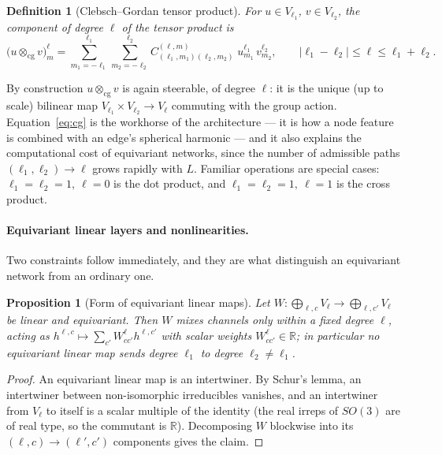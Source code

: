 \documentclass[a4paper,12pt]{article}
\newtheorem{definition}[theorem]{Definition}
\newtheorem{proposition}[theorem]{Proposition}
\theoremstyle{remark}
\begin{document}
\begin{definition}[Clebsch--Gordan tensor product]
\label{def:cg}
For $u\in V_{\ell_1}$, $v\in V_{\ell_2}$, the component of degree $\ell$ of the tensor
product is
\begin{equation}
\label{eq:cg}
\bigl(u\otimes_{\mathrm{cg}}v\bigr)^{\ell}_{m}
=
\sum_{m_1=-\ell_1}^{\ell_1}
\sum_{m_2=-\ell_2}^{\ell_2}
C^{(\ell,m)}_{(\ell_1,m_1)(\ell_2,m_2)}\;
u^{\ell_1}_{m_1}\,v^{\ell_2}_{m_2},
\qquad
|\ell_1-\ell_2|\le\ell\le\ell_1+\ell_2 .
\end{equation}
\end{definition}

By construction $u\otimes_{\mathrm{cg}}v$ is again steerable, of degree $\ell$: it is the
unique (up to scale) bilinear map $V_{\ell_1}\times V_{\ell_2}\to V_\ell$ commuting with
the group action. Equation~\eqref{eq:cg} is the workhorse of the architecture --- it is
how a node feature is combined with an edge's spherical harmonic --- and it also explains
the computational cost of equivariant networks, since the number of admissible paths
$(\ell_1,\ell_2)\to\ell$ grows rapidly with $L$. Familiar operations are special cases:
$\ell_1=\ell_2=1,\ \ell=0$ is the dot product, and $\ell_1=\ell_2=1,\ \ell=1$ is the cross
product.

\paragraph{Equivariant linear layers and nonlinearities.}
Two constraints follow immediately, and they are what distinguish an equivariant network
from an ordinary one.

\begin{proposition}[Form of equivariant linear maps]
\label{prop:schur}
Let $W:\bigoplus_{\ell,c}V_\ell\to\bigoplus_{\ell,c'}V_\ell$ be linear and equivariant.
Then $W$ mixes channels only within a fixed degree $\ell$, acting as
$h^{\ell,c}\mapsto\sum_{c'}W^{\ell}_{cc'}h^{\ell,c'}$ with scalar weights
$W^\ell_{cc'}\in\mathbb R$; in particular no equivariant linear map sends degree $\ell_1$
to degree $\ell_2\neq\ell_1$.
\end{proposition}

\begin{proof}
An equivariant linear map is an intertwiner. By Schur's lemma, an intertwiner between
non-isomorphic irreducibles vanishes, and an intertwiner from $V_\ell$ to itself is a
scalar multiple of the identity (the real irreps of $SO(3)$ are of real type, so the
commutant is $\mathbb R$). Decomposing $W$ blockwise into its $(\ell,c)\to(\ell',c')$
components gives the claim.
\end{proof}
\end{document}
